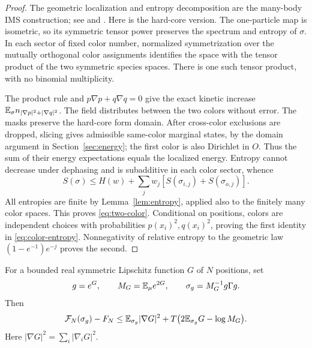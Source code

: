 \begin{proof}
The geometric localization and entropy decomposition are the many-body
IMS construction; see \citet[Section~3]{Lewin2011} and
\citet[Section~3, Lemma~3.1]{DeuchertSeiringerYngvason2019}.
Here is the hard-core version. The one-particle map is isometric, so
its symmetric tensor power preserves the spectrum and entropy of
$\sigma$. In each sector of fixed color number, normalized
symmetrization over the mutually orthogonal color assignments identifies
the space with the tensor product of the two symmetric species spaces.
There is one such tensor product, with no binomial multiplicity.

The product rule and $p\nabla p+q\nabla q=0$ give the exact
kinetic increase $\mathbb E_\sigma n_{|\nabla p|^2+|\nabla q|^2}$.
The field distributes between the two colors without error. The masks
preserve the hard-core form domain. After cross-color exclusions are
dropped, slicing gives admissible same-color marginal states, by the
domain argument in Section~\ref{sec:energy}; the first color is also
Dirichlet in $O$. Thus the sum of their energy expectations equals
the localized energy. Entropy cannot decrease under dephasing and is
subadditive in each color sector, whence
\[
 S(\sigma)\le H(w)+\sum_jw_j
       [S(\sigma_{i,j})+S(\sigma_{o,j})].
\]
All entropies are finite by Lemma~\ref{lem:entropy}, applied also to
the finitely many color spaces. This proves \eqref{eq:two-color}.
Conditional on positions, colors are independent choices with
probabilities $p(x_i)^2,q(x_i)^2$, proving the first identity in
\eqref{eq:color-entropy}. Nonnegativity of relative entropy to the
geometric law $(1-e^{-1})e^{-j}$ proves the second.
\end{proof}

\begin{lemma}\label{lem:tilt}
For a bounded real symmetric Lipschitz function $G$ of $N$ positions,
set
\[
 g=e^G,\qquad M_G=\mathbb E_\mu e^{2G},\qquad
 \sigma_g=M_G^{-1}g\Gamma g.
\]
Then
\begin{equation}\label{eq:diagonal-tilt}
 \mathcal F_N(\sigma_g)-F_N
 \le\mathbb E_{\sigma_g}|\nabla G|^2
       +T\bigl(2\mathbb E_{\sigma_g}G-\log M_G\bigr).
\end{equation}
Here $|\nabla G|^2=\sum_i|\nabla_iG|^2$.
\end{lemma}

